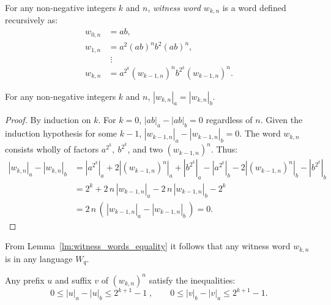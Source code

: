 \begin{defn}
    For any non-negative integers $k$ and $n$, \emph{witness word $w_{k,n}$} is a word defined recursively as:
    \begin{align*}
        w_{0,n} &= ab,\\
        w_{1,n} &= a^2 {(ab)}^n b^2 {(ab)}^n,\\
                &\; \vdots \\
        w_{k,n} &= a^{2^k} {(w_{k-1,n})}^n b^{2^k} {(w_{k-1,n})}^n.
    \end{align*}
\end{defn}

\begin{lemma}\label{lm:witness_words_equality}
    For any non-negative integers $k$ and $n$, $|w_{k,n}|_a = |w_{k,n}|_b$.
\end{lemma}

\begin{proof}
    By induction on $k$. For $k = 0$, $|ab|_a - |ab|_b = 0$ regardless of $n$. Given the induction hypothesis for some $k - 1$, $|w_{k-1,n}|_a - |w_{k-1,n}|_b = 0$. The word $w_{k,n}$ consists wholly of factors $a^{2^k}, \: b^{2^k}$, and two ${(w_{k-1,n})}^n$. Thus:
    \begin{align*}
        |w_{k,n}|_a - |w_{k,n}|_b &= |a^{2^k}|_a + 2|{(w_{k-1,n})}^n|_a + |b^{2^k}|_a - |a^{2^k}|_b - 2|{(w_{k-1,n})}^n|_b - |b^{2^k}|_b \\
        &= 2^k + 2 \, n \, |w_{k-1,n}|_a - 2 \, n \, |w_{k-1,n}|_b - 2^k \\
        &= 2 \, n \, ( \, |w_{k-1,n}|_a - |w_{k-1,n}|_b \, ) = 0.
    \end{align*}
\end{proof}

From Lemma~\ref*{lm:witness_words_equality} it follows that any witness word $w_{k,n}$ is in any language $W_q$.

\begin{lemma}\label{lm:witness_words_inequalities}
    Any prefix $u$ and suffix $v$ of ${(w_{k,n})}^n$ satisfy the inequalities:
    \[
        0 \leq |u|_a - |u|_b \leq 2^{k+1}-1 \; , \qquad 0 \leq |v|_b - |v|_a \leq 2^{k+1}-1.
    \]
\end{lemma}


